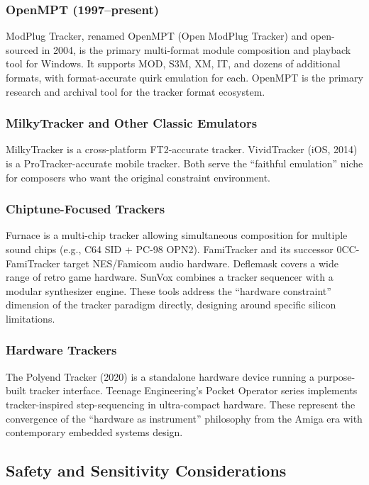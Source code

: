 \documentclass[11pt,letterpaper]{article}
\begin{document}
\subsubsection{OpenMPT (1997--present)}

ModPlug Tracker, renamed OpenMPT (Open ModPlug Tracker) and open-sourced in 2004, is the primary multi-format module composition and playback tool for Windows. It supports MOD, S3M, XM, IT, and dozens of additional formats, with format-accurate quirk emulation for each. OpenMPT is the primary research and archival tool for the tracker format ecosystem.

\subsubsection{MilkyTracker and Other Classic Emulators}

MilkyTracker is a cross-platform FT2-accurate tracker. VividTracker (iOS, 2014) is a ProTracker-accurate mobile tracker. Both serve the ``faithful emulation'' niche for composers who want the original constraint environment.

\subsubsection{Chiptune-Focused Trackers}

Furnace is a multi-chip tracker allowing simultaneous composition for multiple sound chips (e.g., C64 SID + PC-98 OPN2). FamiTracker and its successor 0CC-FamiTracker target NES/Famicom audio hardware. Deflemask covers a wide range of retro game hardware. SunVox combines a tracker sequencer with a modular synthesizer engine. These tools address the ``hardware constraint'' dimension of the tracker paradigm directly, designing around specific silicon limitations.

\subsubsection{Hardware Trackers}

The Polyend Tracker (2020) is a standalone hardware device running a purpose-built tracker interface. Teenage Engineering's Pocket Operator series implements tracker-inspired step-sequencing in ultra-compact hardware. These represent the convergence of the ``hardware as instrument'' philosophy from the Amiga era with contemporary embedded systems design.

\subsection{Safety and Sensitivity Considerations}
\end{document}
